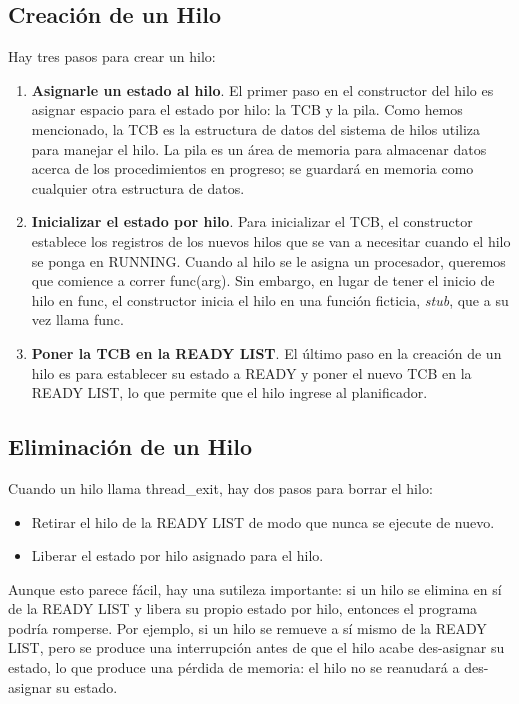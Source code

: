 \documentclass[10pt]{book}
\begin{document}
\subsection{Creación de un Hilo}
Hay tres pasos para crear un hilo:
\begin{enumerate}
\item \textbf{Asignarle un estado al hilo}. El primer paso en el constructor del hilo es asignar espacio para el estado por hilo: la TCB y la pila. Como hemos mencionado, la TCB es la estructura de datos del sistema de hilos utiliza para manejar el hilo. La pila es un área de memoria para almacenar datos acerca de los procedimientos en progreso; se guardará en memoria como cualquier otra estructura de datos.

\item \textbf{Inicializar el estado por hilo}. Para inicializar el TCB, el constructor establece los registros de los nuevos hilos que se van a necesitar cuando el hilo se ponga en RUNNING. Cuando al hilo se le asigna un procesador, queremos que comience a correr {\mf func(arg)}. Sin embargo, en lugar de tener el inicio de hilo en {\mf func}, el constructor inicia el hilo en una función ficticia, \textit{stub}, que a su vez llama {\mf func}.

\item \textbf{Poner la TCB en la READY LIST}. El último paso en la creación de un hilo es para establecer su estado a READY y poner el nuevo TCB en la READY LIST, lo que permite que el hilo ingrese al planificador.
\end{enumerate}

\subsection{Eliminación de un Hilo}
Cuando un hilo llama {\mf thread\_exit}, hay dos pasos para borrar el hilo:
\begin{itemize}
\item Retirar el hilo de la READY LIST de modo que nunca se ejecute de nuevo.
\item Liberar el estado por hilo asignado para el hilo.
\end{itemize}

Aunque esto parece fácil, hay una sutileza importante: si un hilo se elimina en sí de la READY LIST y libera su propio estado por hilo, entonces el programa podría romperse. Por ejemplo, si un hilo se remueve a sí mismo de la READY LIST, pero se produce una interrupción antes de que el hilo acabe des-asignar su estado, lo que produce una pérdida de memoria: el hilo no se reanudará a des-asignar su estado.
\end{document}
